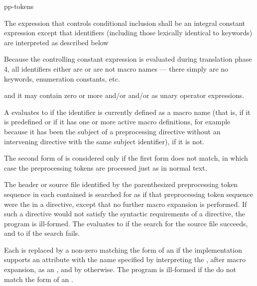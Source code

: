 %
\begin{bnf}
\br
     pp-tokens \terminal{)}
\end{bnf}

\pnum
The expression that controls conditional inclusion
shall be an integral constant expression except that
identifiers
(including those lexically identical to keywords)
are interpreted as described below
\begin{footnote}
Because the controlling constant expression is evaluated
during translation phase 4,
all identifiers either are or are not macro names ---
there simply are no keywords, enumeration constants, etc.
\end{footnote}
and it may contain zero or more  and/or
 and/or
 as unary operator expressions.

\pnum
A  evaluates to 
if the identifier is currently defined
as a macro name
(that is, if it is predefined
or if it has one or more active macro definitions,
for example because
it has been the subject of a
preprocessing directive
without an intervening
directive with the same subject identifier),  if it is not.

\pnum
The second form of 
is considered only if the first form does not match,
in which case the preprocessing tokens are processed just as in normal text.

\pnum
The header or source file identified by
the parenthesized preprocessing token sequence
in each contained 
is searched for as if that preprocessing token sequence
were the  in a  directive,
except that no further macro expansion is performed.
If such a directive would not satisfy the syntactic requirements
of a  directive, the program is ill-formed.
The  evaluates
to  if the search for the source file succeeds, and
to  if the search fails.

\pnum
Each  is replaced by
a non-zero 
matching the form of an 
if the implementation supports an attribute
with the name specified by interpreting
the , after macro expansion,
as an ,
and by  otherwise.
The program is ill-formed if the 
do not match the form of an .


